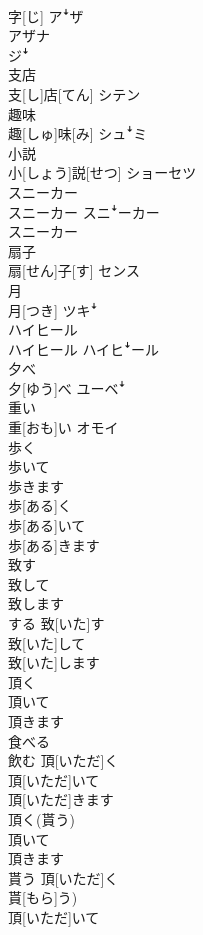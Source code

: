 \documentclass[8pt]{extreport}
\begin{document}
\begin{CJK}{UTF8}{min}
\\	字[じ]	アꜜザ 
\\	アザナ 
\\	ジꜜ
\\	支店	
\\	支[し]店[てん]	シテン
\\	趣味	
\\	趣[しゅ]味[み]	シュꜜミ
\\	小説	
\\	小[しょう]説[せつ]	ショーセツ
\\	スニーカー	
\\	スニーカー	スニꜜーカー 
\\	スニーカー
\\	扇子	
\\	扇[せん]子[す]	センス
\\	月	
\\	月[つき]	ツキꜜ
\\	ハイヒール	
\\	ハイヒール	ハイヒꜜール
\\	夕べ	
\\	夕[ゆう]べ	ユーベꜜ
\\	重い	
\\	重[おも]い	オモイ
\\	歩く 
\\	歩いて 
\\	歩きます	
\\	歩[ある]く 
\\	歩[ある]いて 
\\	歩[ある]きます	
\\	致す 
\\	致して 
\\	致します	
\\	する	致[いた]す 
\\	致[いた]して 
\\	致[いた]します	
\\	頂く 
\\	頂いて 
\\	頂きます	
\\	食べる 
\\	飲む	頂[いただ]く 
\\	頂[いただ]いて 
\\	頂[いただ]きます	
\\	頂く(貰う) 
\\	頂いて 
\\	頂きます	
\\	貰う	頂[いただ]く
\\	貰[もら]う) 
\\	頂[いただ]いて 

\end{CJK}
\end{document}
